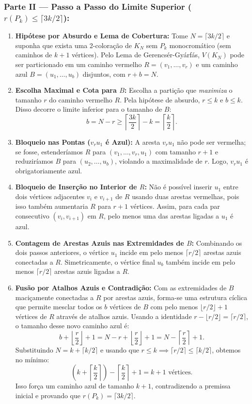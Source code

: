 \documentclass[11pt, a4paper]{article}
\begin{document}
\newpage

\subsubsection{Parte II --- Passo a Passo do Limite Superior ($r(P_k) \le \lceil 3k/2 \rceil$):}
\begin{enumerate}[resume]
    \item \textbf{Hipótese por Absurdo e Lema de Cobertura:} Tome $N = \lceil 3k/2 \rceil$ e suponha que exista uma 2-coloração de $K_N$ sem $P_k$ monocromático (sem caminhos de $k+1$ vértices). Pelo Lema de Gerencsér-Gyárfás, $V(K_N)$ pode ser particionado em um caminho vermelho $R = (v_1, \dots, v_r)$ e um caminho azul $B = (u_1, \dots, u_b)$ disjuntos, com $r + b = N$.
    \item \textbf{Escolha Maximal e Cota para $B$:} Escolha a partição que \textit{maximiza} o tamanho $r$ do caminho vermelho $R$. Pela hipótese de absurdo, $r \le k$ e $b \le k$. Disso decorre o limite inferior para o tamanho de $B$:
    \[ b = N - r \ge \left\lceil \frac{3k}{2} \right\rceil - k = \left\lceil \frac{k}{2} \right\rceil. \]
    \item \textbf{Bloqueio nas Pontas ($v_r u_1$ é Azul):} A aresta $v_r u_1$ não pode ser vermelha; se fosse, estenderíamos $R$ para $(v_1, \dots, v_r, u_1)$ com tamanho $r+1$ e reduziríamos $B$ para $(u_2, \dots, u_b)$, violando a maximalidade de $r$. Logo, $v_r u_1$ é obrigatoriamente azul.
    \item \textbf{Bloqueio de Inserção no Interior de $R$:} Não é possível inserir $u_1$ entre dois vértices adjacentes $v_i$ e $v_{i+1}$ de $R$ usando duas arestas vermelhas, pois isso também aumentaria $R$ para $r+1$ vértices. Assim, para cada par consecutivo $(v_i, v_{i+1})$ em $R$, pelo menos uma das arestas ligadas a $u_1$ é azul.
    \item \textbf{Contagem de Arestas Azuis nas Extremidades de $B$:} Combinando os dois passos anteriores, o vértice $u_1$ incide em pelo menos $\lceil r/2 \rceil$ arestas azuis conectadas a $R$. Simetricamente, o vértice final $u_b$ também incide em pelo menos $\lceil r/2 \rceil$ arestas azuis ligadas a $R$.
    \item \textbf{Fusão por Atalhos Azuis e Contradição:} Com as extremidades de $B$ maciçamente conectadas a $R$ por arestas azuis, forma-se uma estrutura cíclica que permite mesclar todos os $b$ vértices de $B$ com pelo menos $\lfloor r/2 \rfloor + 1$ vértices de $R$ através de atalhos azuis. Usando a identidade $r - \lfloor r/2 \rfloor = \lceil r/2 \rceil$, o tamanho desse novo caminho azul é:
    \[ b + \left\lfloor \frac{r}{2} \right\rfloor + 1 = N - r + \left\lfloor \frac{r}{2} \right\rfloor + 1 = N - \left\lceil \frac{r}{2} \right\rceil + 1. \]
    Substituindo $N = k + \lceil k/2 \rceil$ e usando que $r \le k \implies \lceil r/2 \rceil \le \lceil k/2 \rceil$, obtemos no mínimo:
    \[ \left(k + \left\lceil \frac{k}{2} \right\rceil\right) - \left\lceil \frac{k}{2} \right\rceil + 1 = k + 1 \text{ vértices.} \]
    Isso força um caminho azul de tamanho $k+1$, contradizendo a premissa inicial e provando que $r(P_k) = \lceil 3k/2 \rceil$.
\end{enumerate}
\end{document}
